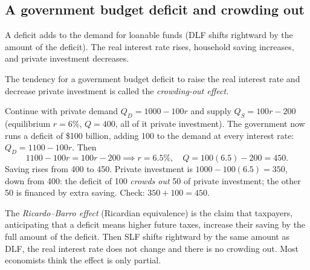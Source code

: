 \subsection{A government budget deficit and crowding out}

A deficit adds to the demand for loanable funds (DLF shifts rightward by the amount of
the deficit). The real interest rate rises, household saving increases, and private
investment decreases.

\begin{definition}
The tendency for a government budget deficit to raise the real interest rate and decrease
private investment is called the \emph{crowding-out effect}.
\end{definition}

\begin{center}
\end{center}

\begin{example}
Continue with private demand $Q_D = 1000 - 100r$ and supply $Q_S = 100r - 200$
(equilibrium $r = 6\%$, $Q = 400$, all of it private investment). The government now
runs a deficit of \$100 billion, adding 100 to the demand at every interest rate:
$Q_D = 1100 - 100r$. Then
\[
  1100 - 100r = 100r - 200 \implies r = 6.5\%, \quad Q = 100(6.5) - 200 = 450.
\]
Saving rises from 400 to 450. Private investment is $1000 - 100(6.5) = 350$, down from
400: the deficit of 100 \emph{crowds out} 50 of private investment; the other 50 is
financed by extra saving. Check: $350 + 100 = 450$.
\end{example}

\begin{definition}
The \emph{Ricardo--Barro effect} (Ricardian equivalence) is the claim that taxpayers,
anticipating that a deficit means higher future taxes, increase their saving by the full
amount of the deficit. Then SLF shifts rightward by the same amount as DLF, the real
interest rate does not change and there is no crowding out. Most economists think the
effect is only partial.
\end{definition}


